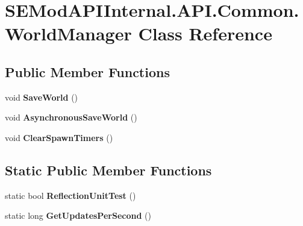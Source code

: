 \hypertarget{class_s_e_mod_a_p_i_internal_1_1_a_p_i_1_1_common_1_1_world_manager}{}\section{S\+E\+Mod\+A\+P\+I\+Internal.\+A\+P\+I.\+Common.\+World\+Manager Class Reference}
\label{class_s_e_mod_a_p_i_internal_1_1_a_p_i_1_1_common_1_1_world_manager}
\subsection*{Public Member Functions}
\begin{DoxyCompactItemize}
\item 
\hypertarget{class_s_e_mod_a_p_i_internal_1_1_a_p_i_1_1_common_1_1_world_manager_a9fd649f276a7affc6815b4ff4c7170ef}{}void {\bfseries Save\+World} ()\label{class_s_e_mod_a_p_i_internal_1_1_a_p_i_1_1_common_1_1_world_manager_a9fd649f276a7affc6815b4ff4c7170ef}

\item 
\hypertarget{class_s_e_mod_a_p_i_internal_1_1_a_p_i_1_1_common_1_1_world_manager_aedbf944c3d389c264409a0f5ac407727}{}void {\bfseries Asynchronous\+Save\+World} ()\label{class_s_e_mod_a_p_i_internal_1_1_a_p_i_1_1_common_1_1_world_manager_aedbf944c3d389c264409a0f5ac407727}

\item 
\hypertarget{class_s_e_mod_a_p_i_internal_1_1_a_p_i_1_1_common_1_1_world_manager_ab5767f91ba71c52531f4f20fc3321a26}{}void {\bfseries Clear\+Spawn\+Timers} ()\label{class_s_e_mod_a_p_i_internal_1_1_a_p_i_1_1_common_1_1_world_manager_ab5767f91ba71c52531f4f20fc3321a26}

\end{DoxyCompactItemize}
\subsection*{Static Public Member Functions}
\begin{DoxyCompactItemize}
\item 
\hypertarget{class_s_e_mod_a_p_i_internal_1_1_a_p_i_1_1_common_1_1_world_manager_ae03203164e421c4a4a673097d53134fd}{}static bool {\bfseries Reflection\+Unit\+Test} ()\label{class_s_e_mod_a_p_i_internal_1_1_a_p_i_1_1_common_1_1_world_manager_ae03203164e421c4a4a673097d53134fd}

\item 
\hypertarget{class_s_e_mod_a_p_i_internal_1_1_a_p_i_1_1_common_1_1_world_manager_ac138717e9d37bd6c2ab432ead25bc572}{}static long {\bfseries Get\+Updates\+Per\+Second} ()\label{class_s_e_mod_a_p_i_internal_1_1_a_p_i_1_1_common_1_1_world_manager_ac138717e9d37bd6c2ab432ead25bc572}

\end{DoxyCompactItemize}
